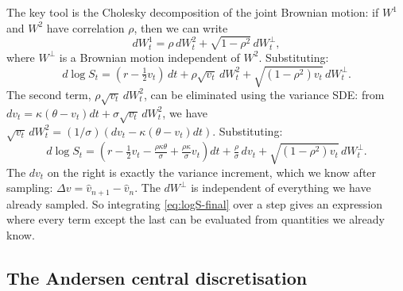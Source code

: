 \documentclass[11pt]{article}
\theoremstyle{plain}
\theoremstyle{definition}
\theoremstyle{remark}
\begin{document}
The key tool is the Cholesky decomposition of the joint Brownian motion: if $W^1$ and $W^2$ have correlation $\rho$, then we can write
\begin{equation}
    dW^1_t = \rho\, dW^2_t + \sqrt{1 - \rho^2}\, dW^\perp_t,                                                    \label{eq:bm-split}
\end{equation}
where $W^\perp$ is a Brownian motion independent of $W^2$. Substituting:
\begin{equation}
    d\log S_t = (r - \tfrac12 v_t)\, dt + \rho\sqrt{v_t}\, dW^2_t + \sqrt{(1-\rho^2) v_t}\, dW^\perp_t.        \label{eq:logS-split}
\end{equation}
The second term, $\rho\sqrt{v_t}\, dW^2_t$, can be eliminated using the variance SDE: from $dv_t = \kappa(\theta - v_t)dt + \sigma\sqrt{v_t}\,dW^2_t$, we have $\sqrt{v_t}\,dW^2_t = (1/\sigma)(dv_t - \kappa(\theta - v_t)dt)$. Substituting:
\begin{equation}
    d\log S_t = \left(r - \tfrac12 v_t - \tfrac{\rho \kappa \theta}{\sigma} + \tfrac{\rho \kappa}{\sigma} v_t\right) dt + \tfrac{\rho}{\sigma}\, dv_t + \sqrt{(1-\rho^2) v_t}\, dW^\perp_t.                                       \label{eq:logS-final}
\end{equation}
The $dv_t$ on the right is exactly the variance increment, which we know after sampling: $\Delta v = \hat v_{n+1} - \hat v_n$. The $dW^\perp$ is independent of everything we have already sampled. So integrating \eqref{eq:logS-final} over a step gives an expression where every term except the last can be evaluated from quantities we already know.

\subsection{The Andersen central discretisation}
\end{document}

